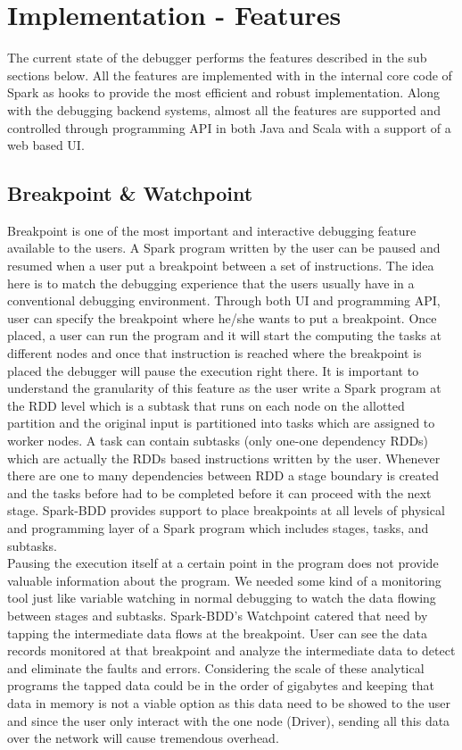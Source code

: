 \documentclass{acm_proc_article-sp}
\begin{document}
\section{Implementation - Features}
The current state of the debugger performs the features described in the sub sections below. All the features are implemented with in the internal core code of Spark as hooks to provide the most efficient and robust implementation. Along with the debugging backend systems, almost all the features are supported and controlled through programming API in both Java and Scala with a support of a web based UI.


\subsection{Breakpoint \& Watchpoint}
Breakpoint is one of the most important and interactive debugging feature available to the users. A Spark program written by the user can be paused and resumed when a user put a breakpoint between a set of instructions. The idea here is to match the debugging experience that the users usually have in a conventional debugging environment. Through both UI and programming API, user can specify the breakpoint where he/she wants to put a breakpoint. Once placed, a user can run the program and it will start the computing the tasks at different nodes and once that instruction is reached where the breakpoint is placed the debugger will pause the execution right there. It is important to understand the granularity of this feature as the user write a Spark program at the RDD level which is a subtask that runs on each node on the allotted partition and the original input is partitioned into tasks which are assigned to worker nodes. A task can contain subtasks (only one-one dependency RDDs) which are actually the RDDs based instructions written by the user. Whenever there are one to many dependencies between RDD a stage boundary is created and the tasks before had to be completed before it can proceed with the next stage. Spark-BDD provides support to place breakpoints at all levels of physical and programming layer of a Spark program which includes stages, tasks, and subtasks.\\
Pausing the execution itself at a certain point in the program does not provide valuable information about the program. We needed some kind of a monitoring tool just like variable watching in normal debugging to watch the data flowing between stages and subtasks. Spark-BDD's Watchpoint catered that need by tapping the intermediate data flows at the breakpoint. User can see the data records monitored at that breakpoint and analyze the intermediate data to detect and eliminate the faults and errors. Considering the scale of these analytical programs the tapped data could be in the order of gigabytes and keeping that data in memory is not a viable option as this data need to be showed to the user and since the user only interact with the one node (Driver), sending all this data over the network will cause tremendous overhead. \\
\end{document}

